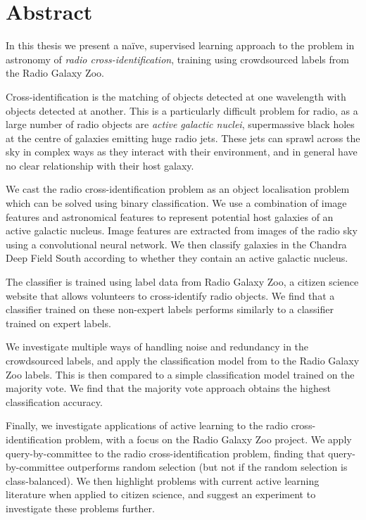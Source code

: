 \chapter*{Abstract}
\label{cha:abstract}

In this thesis we present a na\"ive, supervised learning approach to the problem
in astronomy of \emph{radio cross-identification}, training using crowdsourced
labels from the Radio Galaxy Zoo.

Cross-identification is the matching of objects detected at one wavelength with
objects detected at another. This is a particularly difficult problem for radio,
as a large number of radio objects are \emph{active galactic nuclei},
supermassive black holes at the centre of galaxies emitting huge radio jets.
These jets can sprawl across the sky in complex ways as they interact with their
environment, and in general have no clear relationship with their host galaxy.

We cast the radio cross-identification problem as an object localisation problem
which can be solved using binary classification. We use a combination of image
features and astronomical features to represent potential host galaxies of an
active galactic nucleus. Image features are extracted from images of the radio
sky using a convolutional neural network. We then classify galaxies in the
Chandra Deep Field South according to whether they contain an active galactic
nucleus.

The classifier is trained using label data from Radio Galaxy Zoo, a citizen
science website that allows volunteers to cross-identify radio objects. We find
that a classifier trained on these non-expert labels performs similarly to a
classifier trained on expert labels.

We investigate multiple ways of handling noise and redundancy in the
crowdsourced labels, and apply the classification model from \citet{raykar10} to
the Radio Galaxy Zoo labels. This is then compared to a simple classification
model trained on the majority vote. We find that the majority vote approach
obtains the highest classification accuracy.

Finally, we investigate applications of active learning to the radio
cross-identification problem, with a focus on the Radio Galaxy Zoo project. We
apply query-by-committee to the radio cross-identification problem, finding that
query-by-committee outperforms random selection (but not if the random selection
is class-balanced). We then highlight problems with current active learning
literature when applied to citizen science, and suggest an experiment to
investigate these problems further.
